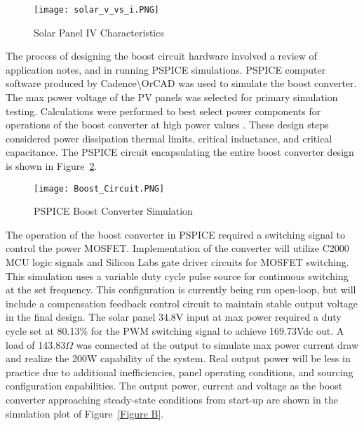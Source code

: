 \begin{figure}
\centering
\texttt{[image: solar\_v\_vs\_i.PNG]}
\caption{Solar Panel IV Characteristics}
\label{Figure 4}
\end{figure}

The process of designing the boost circuit hardware involved a review of application notes, and in running PSPICE simulations. PSPICE computer software  produced by Cadence\textbackslash{}OrCAD was used to simulate the boost converter. The max power voltage  of the PV panels was selected for primary simulation testing. Calculations were performed to best select power components for operations of the boost converter at high power values . These design steps considered power dissipation thermal limits, critical inductance, and critical capacitance. The PSPICE circuit encapsulating the entire boost converter design is shown in Figure~\ref{boostCrct}.

\begin{figure}
\centering
\texttt{[image: Boost\_Circuit.PNG]}
\caption{PSPICE Boost Converter Simulation}
\label{boostCrct}
\end{figure}

The operation of the boost converter in PSPICE required a switching signal to control the power MOSFET. Implementation of the converter will utilize C2000 MCU logic signals and Silicon Labs gate driver circuits for MOSFET switching. This simulation uses a variable duty cycle pulse source  for continuous switching at the set frequency. This configuration is currently being run open-loop, but will include a compensation feedback control circuit to maintain stable output voltage in the final design. The solar panel 34.8V input at max power required a duty cycle set at 80.13\% for the PWM switching signal to achieve 169.73Vdc  out. A load of 143.83$\Omega$ was connected at the output to simulate max power current draw and realize the 200W capability of the system. Real output power will be less in practice due to additional inefficiencies, panel operating conditions, and sourcing configuration capabilities. The output power, current and voltage as the boost converter approaching steady-state conditions from start-up are shown in the simulation plot of Figure~\ref{Figure B}. 

